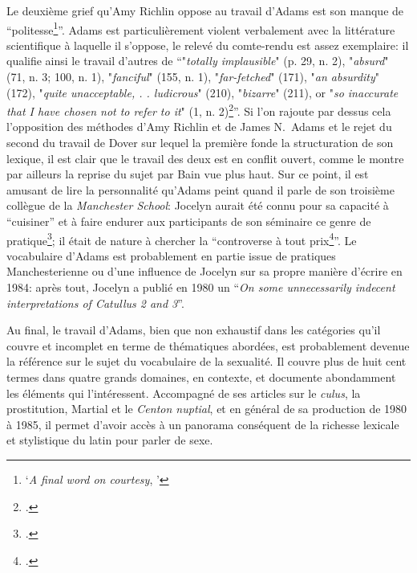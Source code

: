 Le deuxième grief qu'Amy Richlin oppose au travail d'Adams est son manque de \enquote{politesse\footnote{\enquote{\textit{A final word on courtesy}, \textcite[p.~494]{richlin1984latin}}}}. Adams est particulièrement violent verbalement avec la littérature scientifique à laquelle il s'oppose, le relevé du comte-rendu est assez exemplaire: il qualifie ainsi le travail d'autres de \enquote{"\textit{totally implausible}" (p. 29, n. 2), "\textit{absurd}" (71, n. 3; 100, n. 1), "\textit{fanciful}" (155, n. 1), "\textit{far-fetched}" (171), "\textit{an absurdity}" (172), "\textit{quite unacceptable, . . ludicrous}" (210), "\textit{bizarre}" (211), or "\textit{so inaccurate that I have chosen not to refer to it}" (1, n. 2)\footcite[p.~494]{richlin_sexual_1978}}. Si l'on rajoute par dessus cela l'opposition des méthodes d'Amy Richlin et de James N.~Adams et le rejet du second du travail de Dover sur lequel la première fonde la structuration de son lexique, il est clair que le travail des deux est en conflit ouvert, comme le montre par ailleurs la reprise du sujet par Bain vue plus haut. Sur ce point, il est amusant de lire la personnalité qu'Adams peint quand il parle de son troisième collègue de la \textit{Manchester School}: Jocelyn aurait été connu pour sa capacité à \enquote{cuisiner} et à faire endurer aux participants de son séminaire ce genre de pratique\footcite[p.291]{adams_henry_2003}; il était de nature à chercher la \enquote{controverse à tout prix\footcite[p.290]{adams_henry_2003}}. Le vocabulaire d'Adams est probablement en partie issue de pratiques Manchesterienne ou d'une influence de Jocelyn sur sa propre manière d'écrire en 1984: après tout, Jocelyn a publié en 1980 un \enquote{\textit{On some unnecessarily indecent interpretations of Catullus 2 and 3}}.

Au final, le travail d'Adams, bien que non exhaustif dans les catégories qu'il couvre et incomplet en terme de thématiques abordées, est probablement devenue la référence sur le sujet du vocabulaire de la sexualité. Il couvre plus de huit cent termes dans quatre grands domaines, en contexte, et documente abondamment les éléments qui l'intéressent. Accompagné de ses articles sur le \textit{culus}, la prostitution, Martial et le \textit{Centon nuptial}, et en général de sa production de 1980 à 1985, il permet d'avoir accès à un panorama conséquent de la richesse lexicale et stylistique du latin pour parler de sexe.


